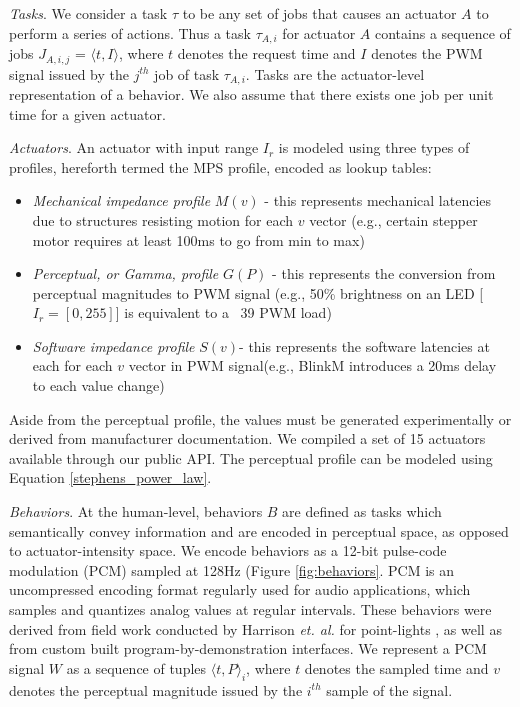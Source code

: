 \documentclass{sigchi}
\begin{document}
  \textit{Tasks}. We consider a  task $\tau$ to be any set of jobs that causes an actuator $A$ to perform a series of actions.  Thus a  task $\tau_{A, i}$ for actuator $A$ contains a sequence of jobs $J_{A,i,j}$ = $\langle t, I \rangle$, where $t$ denotes the request time and $I$ denotes the PWM signal issued by the $j^{th}$ job of task $\tau_{A, i}$. Tasks are the actuator-level representation of a behavior. We also assume that there exists one job per unit time for a given actuator.

  \textit{Actuators}.
  An actuator with input range $I_r$ is modeled using three types of profiles, hereforth termed the MPS profile, encoded as lookup tables:
  \begin{itemize}
      \item \textit{Mechanical impedance profile} $M(v)$ - this represents mechanical latencies due to structures resisting motion for each $v$ vector (e.g., certain stepper motor requires at least 100ms to go from min to max) 
      \item \textit{Perceptual, or Gamma, profile} $G(P)$ - this represents the conversion from  perceptual magnitudes to PWM signal (e.g., 50\% brightness on an LED [$I_r = [0, 255]$] is equivalent to a ~39 PWM load)
      \item \textit{Software impedance profile} $S(v)$- this represents the software latencies at each for each $v$ vector in PWM signal(e.g., BlinkM introduces a 20ms delay to each  value change) 
    \end{itemize}
    Aside from the perceptual profile, the values must be generated experimentally or derived from manufacturer documentation. We compiled a set of 15 actuators available through our public API. The perceptual profile can be modeled using Equation \ref{stephens_power_law}. 


  \textit{Behaviors}. At the human-level, behaviors $B$ are defined as tasks which semantically convey information and are encoded in perceptual space, as opposed to actuator-intensity space. We encode behaviors as a 12-bit pulse-code modulation (PCM) sampled at 128Hz (Figure \ref{fig:behaviors}. PCM is an uncompressed encoding format regularly used for audio applications, which samples and quantizes analog values at regular intervals. These behaviors were derived from field work conducted by Harrison \textit{et. al.} for point-lights \cite{harrison_unlocking_2012}, as well as from custom built program-by-demonstration interfaces. We represent a PCM signal $W$ as a sequence of tuples $\langle t, P \rangle_i$, where $t$ denotes the sampled time and $v$ denotes the perceptual magnitude issued by the $i^{th}$ sample of the signal.
\end{document}
